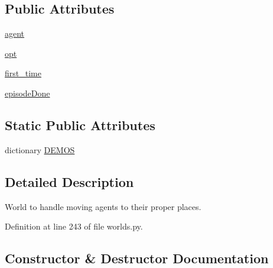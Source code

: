 \subsection*{Public Attributes}
\begin{DoxyCompactItemize}
\item 
\hyperlink{classparlai_1_1chat__service_1_1tasks_1_1overworld__demo_1_1worlds_1_1MessengerOverworld_a0466d551ecaa370b9cd4399d2df674de}{agent}
\item 
\hyperlink{classparlai_1_1chat__service_1_1tasks_1_1overworld__demo_1_1worlds_1_1MessengerOverworld_a56ded4b12c29ec7afe535fa465e2f060}{opt}
\item 
\hyperlink{classparlai_1_1chat__service_1_1tasks_1_1overworld__demo_1_1worlds_1_1MessengerOverworld_a8d15a01f05649c59054dd7983008876b}{first\+\_\+time}
\item 
\hyperlink{classparlai_1_1chat__service_1_1tasks_1_1overworld__demo_1_1worlds_1_1MessengerOverworld_a6770e1e0fb6d4ffcc595a15123dda18c}{episode\+Done}
\end{DoxyCompactItemize}
\subsection*{Static Public Attributes}
\begin{DoxyCompactItemize}
\item 
dictionary \hyperlink{classparlai_1_1chat__service_1_1tasks_1_1overworld__demo_1_1worlds_1_1MessengerOverworld_a2c4d88de708555ff42d4508a25f191be}{D\+E\+M\+OS}
\end{DoxyCompactItemize}


\subsection{Detailed Description}
\begin{DoxyVerb}World to handle moving agents to their proper places.
\end{DoxyVerb}
 

Definition at line 243 of file worlds.\+py.



\subsection{Constructor \& Destructor Documentation}
\mbox{\label{classparlai_1_1chat__service_1_1tasks_1_1overworld__demo_1_1worlds_1_1MessengerOverworld_a8d781f73d10b44cf73c9127588747ff1}} 
